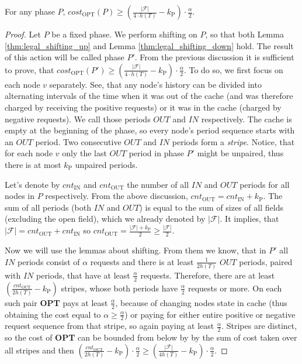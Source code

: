 \begin{lemma}
For any phase $P$, $cost_{\mathrm{OPT}}(P) \geq
(\frac{|\mathcal{F}|}{4 \cdot h(T)} -k_{\mathrm{P}}) \cdot \frac{\alpha}{2}$.
\label{thm:opt_bound_with_F} \end{lemma} \begin{proof} Let $P$ be a fixed phase.
We perform shifting on $P$, so that both Lemma \ref{thm:legal_shifting_up} and
Lemma \ref{thm:legal_shifting_down} hold. The result of this action will be
called phase $P'$. From the previous discussion it is sufficient to prove, that
$cost_{\mathrm{OPT}}(P') \geq (\frac{|\mathcal{F}|}{4 \cdot h(T)}-k_{\mathrm{P}}) \cdot
\frac{\alpha}{2}$. To do so, we first focus on each node $v$ separately. See,
that any node's history can be divided into alternating intervals of the time
when it was out of the cache (and was therefore charged by receiving the
positive requests) or it was in the cache (charged by negative requests). We
call those periods $OUT$ and $IN$ respectively. The cache is empty at the
beginning of the phase, so every node's period sequence starts with an $OUT$
period. Two consecutive $OUT$ and $IN$ periods form a \textit{stripe}. Notice,
that for each node $v$ only the last $OUT$ period in phase $P'$ might be
unpaired, thus there is at most $k_{\mathrm{P}}$ unpaired periods.

Let's denote by $cnt_{\mathrm{IN}}$ and $cnt_{\mathrm{OUT}}$ the number of all
$IN$ and $OUT$ periods for all nodes in $P$ respectively. From the above
discussion, $cnt_{\mathrm{OUT}} = cnt_{\mathrm{IN}} + k_{\mathrm{P}}$. The sum of all
periods (both $IN$ and $OUT$) is equal to the sum of sizes of all fields
(excluding the open field), which we already denoted by $|\mathcal{F}|$. It
implies, that $|\mathcal{F}| = cnt_{\mathrm{OUT}} + cnt_{\mathrm{IN}}$ so
$cnt_{\mathrm{OUT}} = \frac{|\mathcal{F}| + k_{\mathrm{P}}}{2} \geq
\frac{|\mathcal{F}|}{2}.$

Now we will use the lemmas about shifting. From them we know, that in $P'$ all
$IN$ periods consist of $\alpha$ requests and there is at least
$\frac{1}{2h(T)}$ $OUT$ periods, paired with $IN$ periods, that have at least
$\frac{\alpha}{2}$ requests. Therefore, there are at least
$(\frac{cnt_{\mathrm{OUT}}}{2h(T)} - k_{\mathrm{P}})$ stripes, whose both periods have
$\frac{\alpha}{2}$ requests or more. On each such pair \textbf{OPT} pays at
least $\frac{\alpha}{2}$, because of changing nodes state in cache (thus
obtaining the cost equal to $\alpha \geq \frac{\alpha}{2}$) or paying for either
entire positive or negative request sequence from that stripe, so again paying at least $\frac{\alpha}{2}$.  Stripes are distinct, so the
cost of \textbf{OPT} can be bounded from below by by the sum of cost taken over all stripes and then
$(\frac{cnt_{\mathrm{OUT}}}{2h(T)} - k_{\mathrm{P}}) \cdot \frac{\alpha}{2} \geq
(\frac{|\mathcal{F}|}{4h(T)} - k_{\mathrm{P}}) \cdot  \frac{\alpha}{2}$.  \end{proof}

